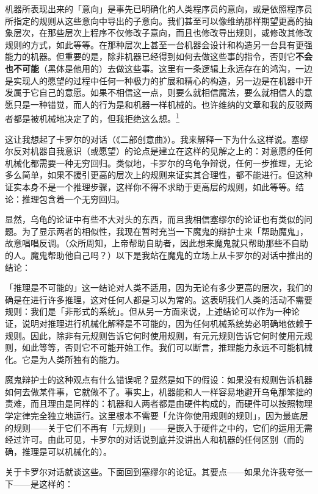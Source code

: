 \documentclass[
  12pt,
  twoside,
  openright,
  oldfontcommands,
]{memoir}
\newcommand{\heititext}[1]{{\heifamily\bfseries #1}}
\begin{document}
机器所表现出来的「意向」是事先已明确化的人类程序员的意向，或是依照程序员所指定的规则从这些意向中导出的子意向。我们甚至可以像维纳那样期望更高的抽象层次，在那些层次上程序不仅修改子意向，而且也修改导出规则，或修改其修改规则的方式，如此等等。在那种层次上甚至一台机器会设计和构造另一台具有更强能力的机器。但重要的是，除非机器已经得到如何去做这些事的指令，否则它\heititext{不会也不可能}（黑体是他用的）去做这些事。这里有一条逻辑上永远存在的鸿沟，一边是实现人的愿望的过程中任何一种极力的扩展和精心的构造，另一边是在机器中开发属于它自己的意愿。如果不相信这一点，则要么就相信魔法，要么就相信人的意愿只是一种错觉，而人的行为是和机器一样机械的。也许维纳的文章和我的反驳两者都是被机械地决定了的，但我拒绝这么想。\hyperref[fn:Chapter20-1]{\textsuperscript{1}}

这让我想起了卡罗尔的对话（《二部创意曲》）。我来解释一下为什么这样说。塞缪尔反对机器自我意识（或愿望）的论点是建立在这样的见解之上的：对意愿的任何机械化都需要一种无穷回归。类似地，卡罗尔的乌龟争辩说，任何一步推理，无论多么简单，如果不援引更高的层次上的规则来证实其合理性，都不能进行。但这种证实本身不是一个推理步骤，这样你不得不求助于更高层的规则，如此等等。结论：推理包含着一个无穷回归。

显然，乌龟的论证中有些不大对头的东西，而且我相信塞缪尔的论证也有类似的问题。为了显示两者的相似性，我现在暂时充当一下魔鬼的辩护士来「帮助魔鬼」，故意唱唱反调。（众所周知，上帝帮助自助者，因此想来魔鬼就只帮助那些不自助的人。魔鬼帮助他自己吗？）以下是我站在魔鬼的立场上从卡罗尔的对话中推出的结论：

「推理是不可能的」这一结论对人类不适用，因为无论有多少更高的层次，我们的确是在进行许多推理，这对任何人都是习以为常的。这表明我们人类的活动不需要规则：我们是「非形式的系统」。但从另一方面来说，上述结论可以作为一种论证，说明对推理进行机械化解释是不可能的，因为任何机械系统势必明确地依赖于规则。因此，除非有元规则告诉它何时使用规则，有元元规则告诉它何时使用元规则，如此等等，否则它不可能开始工作。我们可以断言，推理能力永远不可能机械化。它是为人类所独有的能力。

魔鬼辩护士的这种观点有什么错误呢？显然是如下的假设：如果没有规则告诉机器如何去做某件事，它就做不了。事实上，机器能和人一样容易地避开乌龟那笨拙的责难，而且理由是同样的：机器和人两者都是由硬件构成的，而硬件可以按照物理学定律完全独立地运行。这里根本不需要「允许你使用规则的规则」，因为最底层的规则------关于它们不再有「元规则」------是嵌入于硬件之中的，它们的运用无需经过许可。由此可见，卡罗尔的对话说到底并没讲出人和机器的任何区别（而的确，推理是可以机械化的）。

关于卡罗尔对话就谈这些。下面回到塞缪尔的论证。其要点------如果允许我夸张一下------是这样的：
\end{document}
